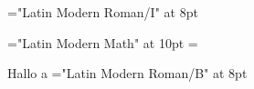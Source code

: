 %
%
%
\def\fontsize{8pt}
\def\fontstyle{I}
\def\bf{\if\fontstyle B \def\fontstyle{BI}\else\def\fontstyle{I}\fi}
\font\regular="Latin Modern Roman/\fontstyle" at \fontsize

\font\math="Latin Modern Math" at 10pt
=\regular



\regular
Hallo {\math a}
\def\fontstyle{B}
\font\regular="Latin Modern Roman/\fontstyle" at \fontsize


\bye

